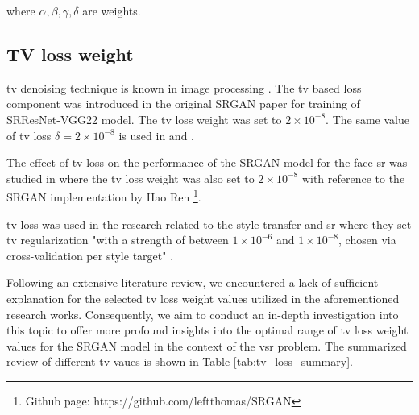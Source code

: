 \documentclass[conference]{IEEEtran}
\begin{document}
where $\alpha, \beta, \gamma, \delta$ are weights.

\subsection{TV loss weight}

\Acrfull{tv} denoising technique is known in image processing \cite{nonlinear_total_variation_noise_removal_1992}. The \acrlong{tv} based loss component was introduced in the original SRGAN paper \cite{srgan_2016} for training of SRResNet-VGG22 model. The \acrshort{tv} loss weight was set to $2 \times 10^{-8}$. The same value of \acrshort{tv} loss $\delta=2 \times 10^{-8}$ is used in \cite{iSeeBetter_2020} and \cite{iSeeBetter_milestone}.

The effect of \acrshort{tv} loss on the performance of the SRGAN model for the face \acrlong{sr} was studied in \cite{SRGAN_with_tv_loss_face_2020} where the \acrshort{tv} loss weight was also set to $2 \times 10^{-8}$ with reference to the SRGAN implementation by Hao Ren \footnote{Github page: https://github.com/leftthomas/SRGAN}.

\Acrshort{tv} loss was used in the research related to the style transfer and \acrlong{sr} \cite{Perceptual_Losses_for_Real_Time_Style_Transfer_and_Super_Resolution_2016} where they set \acrlong{tv} regularization "with a strength of between $1 \times 10^{-6}$ and $1 \times 10^{-8}$, chosen via cross-validation per style target" \cite{Perceptual_Losses_for_Real_Time_Style_Transfer_and_Super_Resolution_2016}.

Following an extensive literature review, we encountered a lack of sufficient explanation for the selected \acrshort{tv} loss weight values utilized in the aforementioned research works. Consequently, we aim to conduct an in-depth investigation into this topic to offer more profound insights into the optimal range of \acrshort{tv} loss weight values for the SRGAN model in the context of the \acrshort{vsr} problem. The summarized review of different \acrshort{tv} vaues is shown in Table \ref{tab:tv_loss_summary}.
\end{document}
